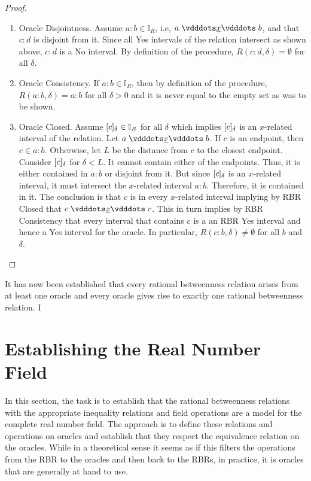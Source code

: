 \documentclass[12pt]{article}
\begin{document}
\begin{proof}
\begin{enumerate}
        \item Oracle Disjointness. Assume $a:b \in \mathbb{I}_R$, i.e, $a \xrel b$, and that $c:d$ is disjoint from it. Since all Yes intervals of the relation intersect as shown above, $c:d$ is a No interval. By definition of the procedure, $R(c:d, \delta) = \emptyset$ for all $\delta$. 
        \item Oracle Consistency. If $a:b \in \mathbb{I}_R$, then by definition of the procedure, $R(a:b, \delta) = a:b$ for all $\delta >0$ and it is never equal to the empty set as was to be shown. 
        \item Oracle Closed. Assume $[c]_{\delta} \in \mathbb{I}_R$ for all $\delta$ which implies $[c]_{\delta}$ is an $x$-related interval of the relation. Let $a \xrel b$. If $c$ is an endpoint, then $c \in a:b$. Otherwise, let $L$ be the distance from $c$ to the closest endpoint. Consider $[c]_{\delta}$ for $\delta < L$. It cannot contain either of the endpoints. Thus, it is either contained in $a:b$ or disjoint from it. But since $[c]_{\delta}$ is an $x$-related interval, it must intersect the $x$-related interval $a:b$. Therefore, it is contained in it. The conclusion is that $c$ is in every $x$-related interval implying by RBR Closed that $c \xrel c$. This in turn implies by RBR Consistency that every interval that contains $c$ is a an RBR Yes interval and hence a Yes interval for the oracle. In particular, $R(c:b, \delta) \neq \emptyset$ for all $b$ and $\delta$. 
    \end{enumerate}
\end{proof}


It has now been established that every rational betweenness relation arises from at least one oracle and every oracle gives rise to exactly one rational betweenness relation. I 




\section{Establishing the Real Number Field}

In this section, the task is to establish that the rational betweenness relations with the appropriate inequality relations and field operations are a model for the complete real number field. The approach is to define these relations and operations on oracles and establish that they respect the equivalence relation on the oracles. While in a theoretical sense it seems as if this filters the operations from the RBR to the oracles and then back to the RBRs, in practice, it is oracles that are generally at hand to use. 
\end{document}
